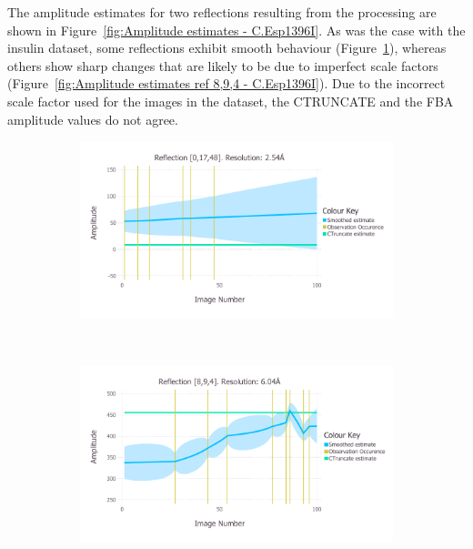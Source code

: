 The amplitude estimates for two reflections resulting from the processing are shown in Figure~\ref{fig:Amplitude estimates - C.Esp1396I}.
As was the case with the insulin dataset, some reflections exhibit smooth behaviour (Figure~\ref{fig:Amplitude estimates ref 0,17,48 - C.Esp1396I}), whereas others show sharp changes that are likely to be due to imperfect scale factors (Figure~\ref{fig:Amplitude estimates ref 8,9,4 - C.Esp1396I}).
Due to the incorrect scale factor used for the images in the dataset, the CTRUNCATE and the FBA amplitude values do not agree.
\begin{figure}
    \centering
    \begin{subfigure}[b]{1.0\textwidth}
            \centering
            \includegraphics[width=\textwidth]{figures/datared/SmoothedPlot_0,17,48_res3.pdf}
            \caption{}
            \label{fig:Amplitude estimates ref 0,17,48 - C.Esp1396I}
    \end{subfigure}
    \\
    \begin{subfigure}[b]{1.0\textwidth}
            \centering
            \includegraphics[width=\textwidth]{figures/datared/SmoothedPlot_8,9,4_res6.pdf}

\end{subfigure}
\end{figure}
